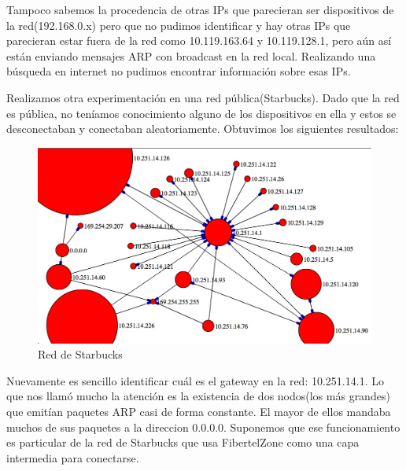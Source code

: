 Tampoco sabemos la procedencia de otras IPs que parecieran ser dispositivos de la red(192.168.0.x) pero que no pudimos identificar y hay otras IPs que parecieran estar fuera de la red como 10.119.163.64 y 10.119.128.1, pero aún así están enviando mensajes ARP con broadcast en la red local. Realizando una búsqueda en internet no pudimos encontrar información sobre esas IPs.

Realizamos otra experimentación en una red pública(Starbucks). Dado que la red es pública, no teníamos conocimiento alguno de los dispositivos en ella y estos se desconectaban y conectaban aleatoriamente. Obtuvimos los siguientes resultados:

\begin{figure}[!h]
	\begin{center}
		  \includegraphics[scale=0.4]{Graficos/grafico_3.png}
		  \caption{Red de Starbucks}
		  \label{fig:contra1}
	\end{center}
\end{figure}

Nuevamente es sencillo identificar cuál es el gateway en la red: 10.251.14.1. Lo que nos llamó mucho la atención es la existencia de dos nodos(los más grandes) que emitían paquetes ARP casi de forma constante. El mayor de ellos mandaba muchos de sus paquetes a la direccion 0.0.0.0. Suponemos que ese funcionamiento es particular de la red de Starbucks que usa FibertelZone como una capa intermedia para conectarse.

